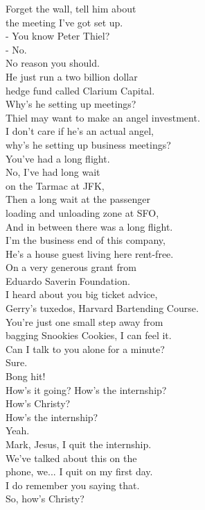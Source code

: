 \documentclass{article}
\begin{document}
\begin{multicols}{3}
Forget the wall, tell him about\\
the meeting I've got set up.\\
- You know Peter Thiel?\\
- No.\\
No reason you should.\\
He just run a two billion dollar\\
hedge fund called Clarium Capital.\\
Why's he setting up meetings?\\
Thiel may want to make an angel investment.\\
I don't care if he's an actual angel,\\
why's he setting up business meetings?\\
You've had a long flight.\\
No, I've had long wait\\
on the Tarmac at JFK,\\
Then a long wait at the passenger\\
loading and unloading zone at SFO,\\
And in between there was a long flight.\\
I'm the business end of this company,\\
He's a house guest living here rent-free.\\
On a very generous grant from\\
Eduardo Saverin Foundation.\\
I heard about you big ticket advice,\\
Gerry's tuxedos, Harvard Bartending Course.\\
You're just one small step away from\\
bagging Snookies Cookies, I can feel it.\\
Can I talk to you alone for a minute?\\
Sure.\\
Bong hit!\\
How's it going? How's the internship?\\
How's Christy?\\
How's the internship?\\
Yeah.\\
Mark, Jesus, I quit the internship.\\
We've talked about this on the\\
phone, we... I quit on my first day.\\
I do remember you saying that.\\
So, how's Christy?\\

\end{multicols}
\end{document}
